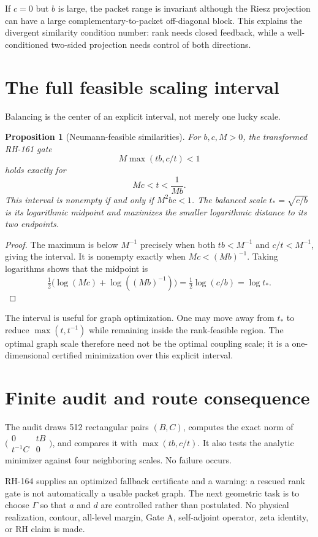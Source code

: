 \documentclass[12pt]{article}
\newtheorem{proposition}[theorem]{Proposition}
\begin{document}
If $c=0$ but $b$ is large, the packet range is invariant although the Riesz
projection can have a large complementary-to-packet off-diagonal block.
This explains the divergent similarity condition number: rank needs closed
feedback, while a well-conditioned two-sided projection needs control of
both directions.

\section{The full feasible scaling interval}
Balancing is the center of an explicit interval, not merely one lucky scale.

\begin{proposition}[Neumann-feasible similarities]
For $b,c,M>0$, the transformed RH-161 gate
\[
 M\max(tb,c/t)<1
\]
holds exactly for
\[
 Mc<t<\frac1{Mb}.
\]
This interval is nonempty if and only if $M^2bc<1$.  The balanced scale
$t_*=\sqrt{c/b}$ is its logarithmic midpoint and maximizes the smaller
logarithmic distance to its two endpoints.
\end{proposition}
\begin{proof}
The maximum is below $M^{-1}$ precisely when both
$tb<M^{-1}$ and $c/t<M^{-1}$, giving the interval.  It is nonempty exactly
when $Mc<(Mb)^{-1}$.  Taking logarithms shows that the midpoint is
\[
 \tfrac12\bigl(\log(Mc)+\log((Mb)^{-1})\bigr)
 =\tfrac12\log(c/b)=\log t_*.
\]
\end{proof}

The interval is useful for graph optimization.  One may move away from
$t_*$ to reduce $\max(t,t^{-1})$ while remaining inside the rank-feasible
region.  The optimal graph scale therefore need not be the optimal coupling
scale; it is a one-dimensional certified minimization over this explicit
interval.

\section{Finite audit and route consequence}
The audit draws 512 rectangular pairs $(B,C)$, computes the exact norm of
$\bigl(\begin{smallmatrix}0&tB\\t^{-1}C&0\end{smallmatrix}\bigr)$, and
compares it with $\max(tb,c/t)$.  It also tests the analytic minimizer against
four neighboring scales.  No failure occurs.

RH-164 supplies an optimized fallback certificate and a warning: a rescued
rank gate is not automatically a usable packet graph.  The next geometric
task is to choose $\Gamma$ so that $a$ and $d$ are controlled rather than
postulated.  No physical realization, contour, all-level margin, Gate A,
self-adjoint operator, zeta identity, or RH claim is made.



\end{document}

